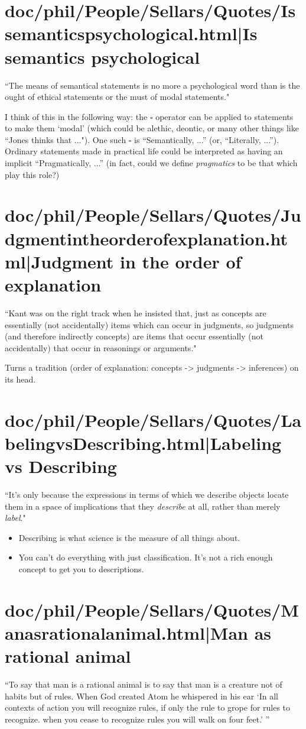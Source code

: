 \documentclass[12pt,a4paper]{report}
\begin{document}
\chapter{doc/phil/People/Sellars/Quotes/Issemanticspsychological.html|Is semantics psychological}
``The means of semantical statements is no more a psychological word than is
the ought of ethical statements or the must of modal statements."

I think of this in the following way: the $\square$ operator can be applied to
statements to make them `modal' (which could be alethic, deontic, or many other
things like ``Jones thinks that ..."). One such $\square$ is ``Semantically,
...'' (or, ``Literally, ...''). Ordinary statements made in practical life
 could be interpreted as having an implicit ``Pragmatically, ...'' (in fact,
 could we define \emph{pragmatics} to be that which play this role?)
\chapter{doc/phil/People/Sellars/Quotes/Judgmentintheorderofexplanation.html|Judgment in the order of explanation}

``Kant was on the right track when he insisted that, just as concepts are
essentially (not accidentally) items which can occur in judgments, so judgments
(and therefore indirectly concepts) are items that occur essentially (not
accidentally) that occur in reasonings or arguments."

Turns a tradition (order of explanation: concepts -> judgments -> inferences)
on its head.

\chapter{doc/phil/People/Sellars/Quotes/LabelingvsDescribing.html|Labeling vs Describing}
``It's only because the expressions in terms of which we describe objects locate
them in a space of implications that they \emph{describe} at all, rather than
merely \emph{label}."

\begin{itemize}
    \item Describing is what science is the measure of all things about.
    \item You can't do everything with just classification. It's not a rich
         enough concept to get you to descriptions.
\end{itemize}
\chapter{doc/phil/People/Sellars/Quotes/Manasrationalanimal.html|Man as rational animal}
``To say that man is a rational animal is to say that man is a creature not of
habits but of rules. When God created Atom he whispered in his ear `In all
contexts of action you will recognize rules, if only the rule to grope for rules
to recognize. when you cease to recognize rules you will walk on four feet.' ''
\end{document}
